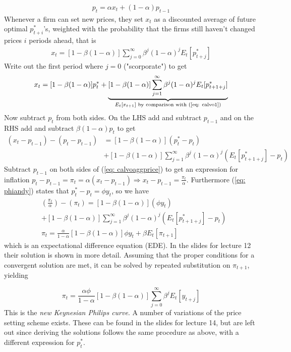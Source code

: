 \documentclass[12pt, a4paper]{article}
\begin{document}
\begin{spacing}{1.213}
\begin{align} \label{eq: calvoaggprice}
p_t = \alpha x_t + (1-\alpha) p_{t-1}
\end{align}
Whenever a firm can set new prices, they set $x_t$ as a discounted average of future optimal $p^*_{t+i}$'s, weighted with the probability that the firms still haven't changed prices $i$ periods ahead, that is 
\begin{align} \label{eq: calvo1}
x_t = [1- \beta(1-\alpha)] \sum_{j=0}^{\infty} \beta^j(1-\alpha)^j E_t [p_{t+j}^*]
\end{align}
Write out the first period where $j=0$ ("scorporate") to get 
\begin{align*}
x_t = [1- \beta(1-\alpha)]p_t^* + \underbrace{[1- \beta(1-\alpha)] \sum_{j=1}^{\infty} \beta^j(1-\alpha)^j E_t [p_{t+1+j}^*]}_{E_t[x_{t+1}] \textrm{ by comparison with (\ref{eq: calvo1})}}
\end{align*}
Now subtract $p_t$ from both sides. On the LHS add and subtract $p_{t-1}$ and on the RHS add and subtract $\beta(1-\alpha)p_t$ to get 
\begin{align*}
(x_t-p_{t-1})-(p_{t}-p_{t-1}) &= [1- \beta(1-\alpha)](p_t^*- p_t) \\ 
& + [1- \beta(1-\alpha)] \sum_{j=1}^{\infty} \beta^j(1-\alpha)^j (E_t [p_{t+1+j}^*] - p_t)
\end{align*}
Subtract $p_{t-1}$ on both sides of (\ref{eq: calvoaggprice}) to get an expression for inflation $p_t - p_{t-1} = \pi_t = \alpha(x_t - p_{t-1}) \Rightarrow x_t - p_{t-1} = \frac{\pi_t}{\alpha}$. Furthermore (\ref{eq: phiandy}) states that $p_t^* - p_t = \phi y_t$, so we have 
\begin{align*}
&(\frac{\pi_t}{\alpha})-(\pi_t) = [1- \beta(1-\alpha)](\phi y_t) \\ 
& + [1- \beta(1-\alpha)] \sum_{j=1}^{\infty} \beta^j(1-\alpha)^j (E_t [p_{t+1+j}^*] - p_t) \\
&\pi_t = \frac{\alpha}{1-\alpha}[1- \beta(1-\alpha)]\phi y_t + \beta E_t[\pi_{t+1}]
\end{align*}
which is an expectational difference equation (EDE). In the slides for lecture 12 their solution is shown in more detail. Assuming that the proper conditions for a convergent solution are met, it can be solved by repeated substitution on $\pi_{t+1}$, yielding

\begin{equation}
\pi_t = \frac{\alpha \phi}{1- \alpha}[1- \beta(1-\alpha)] \sum_{j=0}^{\infty} \beta^j E_t [y_{t+j}]
\end{equation}
This is the \textit{new Keynesian Philips curve}. A number of variations of the price setting scheme exists. These can be found in the slides for lecture 14, but are left out since deriving the solutions follows the same procedure as above, with a different expression for $p_t^*$. 



\end{spacing}
\end{document}

